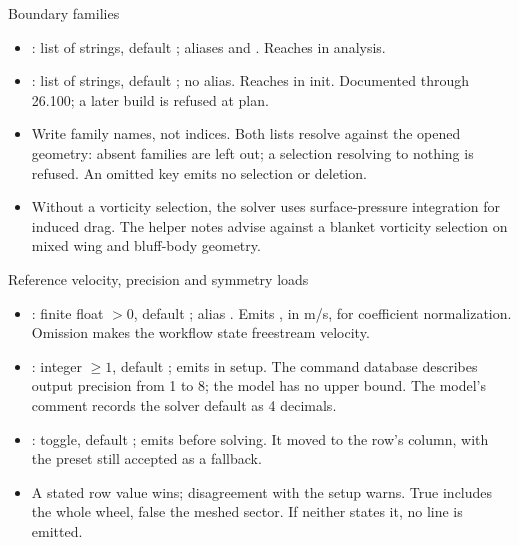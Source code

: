 \begin{frame}{Boundary families}
\begin{itemize}\small
  \item {}: list of strings, default
        ; aliases  and
        . Reaches
         in analysis.
  \item {}: list of strings, default
        ; no alias. Reaches
         in init.
        Documented through 26.100; a later build is refused at plan.
  \item Write family names, not indices. Both lists resolve against the
        opened geometry: absent families are left out; a selection resolving
        to nothing is refused. An omitted key emits no selection or deletion.
  \item Without a vorticity selection, the solver uses surface-pressure
        integration for induced drag. The helper notes advise against a
        blanket vorticity selection on mixed wing and bluff-body geometry.
\end{itemize}
\end{frame}

\begin{frame}{Reference velocity, precision and symmetry loads}
\begin{itemize}\small
  \item {}: finite float $>0$, default
        ; alias . Emits
        , in m/s, for coefficient
        normalization. Omission makes the workflow state freestream velocity.
  \item {}: integer $\geq 1$, default ;
        emits  in setup. The command database
        describes output precision from 1 to 8; the model has no upper bound.
        The model's comment records the solver default as 4 decimals.
  \item {}: toggle, default ; emits
         before solving.
        It moved to the row's  column, with the
        preset still accepted as a fallback.
  \item A stated row value wins; disagreement with the setup warns.
        True includes the whole wheel, false the meshed sector. If neither
        states it, no line is emitted.
\end{itemize}
\end{frame}
